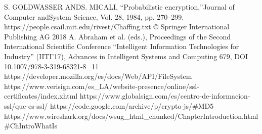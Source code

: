 \documentclass[12pt, a4paper, titlepage]{report}
\begin{document}
\begin{thebibliography}{20}
		S.  GOLDWASSER  ANDS. MICALI, “Probabilistic encryption,”Journal  of Computer andSystem Science, Vol. 28, 1984, pp. 270–299.
		https://people.csail.mit.edu/rivest/Chaffing.txt
		© Springer International Publishing AG 2018
        A. Abraham et al. (eds.), Proceedings of the Second International
        Scientific Conference “Intelligent Information Technologies for Industry” (IITI’17),
        Advances in Intelligent Systems and Computing 679, DOI 10.1007/978-3-319-68321-8\_11
        https://developer.mozilla.org/es/docs/Web/API/FileSystem
            https://www.verisign.com/es\_LA/website-presence/online/ssl-certificates/index.xhtml
        https://www.globalsign.com/es/centro-de-informacion-ssl/que-es-ssl/
        https://code.google.com/archive/p/crypto-js/\#MD5
        https://www.wireshark.org/docs/wsug\_html\_chunked/ChapterIntroduction.html\#ChIntroWhatIs
	\end{thebibliography}	
\end{document}
